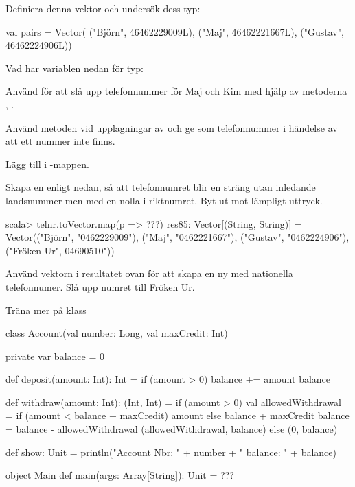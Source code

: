 {{\Subtask Definiera denna vektor och undersök dess typ:
\begin{Code}
val pairs = Vector(
  ("Björn", 46462229009L), 
  ("Maj", 46462221667L), 
  ("Gustav", 46462224906L))
\end{Code}

\Subtask Vad har variablen  nedan för typ: \\ 

\Subtask Använd  för att slå upp telefonnummer för Maj och Kim med hjälp av metoderna , .

\Subtask Använd metoden  vid upplagningar av  och ge  som telefonnummer i händelse av att ett nummer inte finns. 

\Subtask Lägg till  i -mappen.

\Subtask Skapa en  enligt nedan, så att telefonnumret blir en sträng utan inledande landsnummer men med en nolla i riktnumret. Byt ut  mot lämpligt uttryck.
\begin{REPL}
scala> telnr.toVector.map(p => ???) 
res85: Vector[(String, String)] = Vector(("Björn", "0462229009"), ("Maj", 
"0462221667"), ("Gustav", "0462224906"), ("Fröken Ur", 04690510"))

\end{REPL}

\Subtask Använd vektorn i resultatet ovan för att skapa en ny  med nationella telefonnumer. Slå upp numret till Fröken Ur.

\ExtraTasks %


\Task Träna mer på  klass

\begin{Code}
class Account(val number: Long, val maxCredit: Int){ 
  private var balance = 0
  
  def deposit(amount: Int): Int = { 
    if (amount > 0) {balance += amount}
    balance
  }
  
  def withdraw(amount: Int): (Int, Int) = if (amount > 0) { 
    val allowedWithdrawal = 
      if (amount < balance + maxCredit) amount 
      else balance + maxCredit 
    balance = balance - allowedWithdrawal
    (allowedWithdrawal, balance)
  } else (0, balance)
  
  def show: Unit = 
    println("Account Nbr: " + number + " balance: " + balance) 
}

object Main {
  def main(args: Array[String]): Unit = {
    ???
  }
}
\end{Code}



}}
